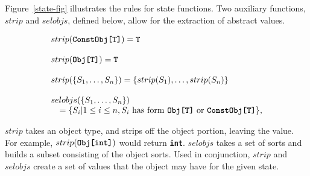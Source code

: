 \documentclass[12pt]{article} %
\newcommand{\reserved}[1]{\textbf{\texttt{#1}}} %
\begin{document}
Figure~\ref{state-fig} illustrates the rules for state functions. Two
auxiliary functions, $strip$ and $selobjs$, defined below, allow for
the extraction of abstract values. 

\begin{displaymath}
\begin{array}{l}
strip(\mbox{\reserved{ConstObj[T]}}) = \reserved{T} \\
\\
strip(\mbox{\reserved{Obj[T]}}) = \reserved{T}\\
\\
strip(\{S_1,\dots,S_n\}) = \{strip(S_1),\dots,strip(S_n)\}\\
\\
selobjs(\{S_1,\dots,S_n\})\\
~~~=\{S_i | 1 \leq i \leq n, S_i\mbox{ has form \reserved{Obj[T]} or \reserved{ConstObj[T]}}\},\\
\end{array}
\end{displaymath}

\noindent $strip$ takes an object type, and
strips off the object portion, leaving the value. For example,
$strip(\reserved{Obj[int]})$ would return \reserved{int}. $selobjs$
takes a set of sorts and builds a subset consisting of the object
sorts. Used in conjunction, $strip$ and $selobjs$ create a set of
values that the object may have for the given state.
\end{document}
